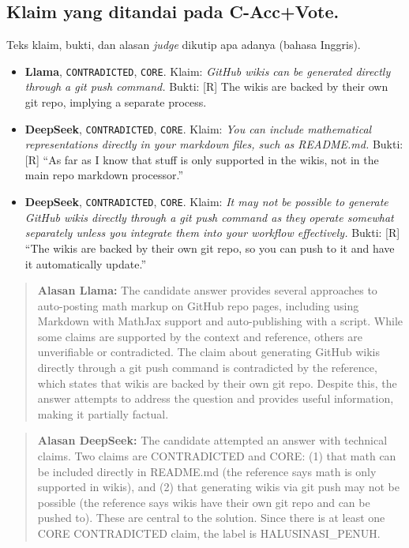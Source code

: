 \subsection{Klaim yang ditandai pada C-Acc+Vote.} Teks klaim, bukti, dan alasan \emph{judge} dikutip apa adanya (bahasa Inggris).
\begin{itemize}\small
\item \textbf{Llama}, \texttt{CONTRADICTED}, \texttt{CORE}. Klaim: \emph{GitHub wikis can be generated directly through a git push command.} Bukti: [R] The wikis are backed by their own git repo, implying a separate process.
\item \textbf{DeepSeek}, \texttt{CONTRADICTED}, \texttt{CORE}. Klaim: \emph{You can include mathematical representations directly in your markdown files, such as README.md.} Bukti: [R] “As far as I know that stuff is only supported in the wikis, not in the main repo markdown processor.”
\item \textbf{DeepSeek}, \texttt{CONTRADICTED}, \texttt{CORE}. Klaim: \emph{It may not be possible to generate GitHub wikis directly through a git push command as they operate somewhat separately unless you integrate them into your workflow effectively.} Bukti: [R] “The wikis are backed by their own git repo, so you can push to it and have it automatically update.”
\end{itemize}
\begin{quote}\small\textbf{Alasan Llama:} The candidate answer provides several approaches to auto-posting math markup on GitHub repo pages, including using Markdown with MathJax support and auto-publishing with a script. While some claims are supported by the context and reference, others are unverifiable or contradicted. The claim about generating GitHub wikis directly through a git push command is contradicted by the reference, which states that wikis are backed by their own git repo. Despite this, the answer attempts to address the question and provides useful information, making it partially factual.\end{quote}
\begin{quote}\small\textbf{Alasan DeepSeek:} The candidate attempted an answer with technical claims. Two claims are CONTRADICTED and CORE: (1) that math can be included directly in README.md (the reference says math is only supported in wikis), and (2) that generating wikis via git push may not be possible (the reference says wikis have their own git repo and can be pushed to). These are central to the solution. Since there is at least one CORE CONTRADICTED claim, the label is HALUSINASI\_PENUH.\end{quote}
